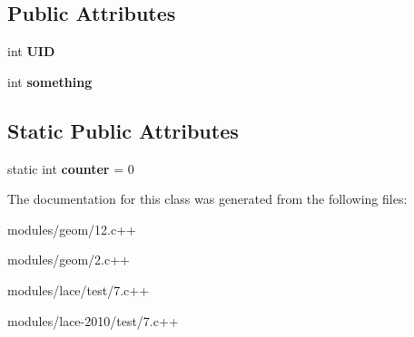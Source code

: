 \subsection*{Public Attributes}
\begin{DoxyCompactItemize}
\item 
\hypertarget{classA_a81c7394c6570bc8115e1e39230ee3c0e}{int {\bfseries U\-I\-D}}\label{classA_a81c7394c6570bc8115e1e39230ee3c0e}

\item 
\hypertarget{classA_a6b99184d37198b84376a7ba2e250d033}{int {\bfseries something}}\label{classA_a6b99184d37198b84376a7ba2e250d033}

\end{DoxyCompactItemize}
\subsection*{Static Public Attributes}
\begin{DoxyCompactItemize}
\item 
\hypertarget{classA_ab7a4d4b28a3dddc9f936858223cbeca5}{static int {\bfseries counter} = 0}\label{classA_ab7a4d4b28a3dddc9f936858223cbeca5}

\end{DoxyCompactItemize}


The documentation for this class was generated from the following files\-:\begin{DoxyCompactItemize}
\item 
modules/geom/12.\-c++\item 
modules/geom/2.\-c++\item 
modules/lace/test/7.\-c++\item 
modules/lace-\/2010/test/7.\-c++\end{DoxyCompactItemize}
